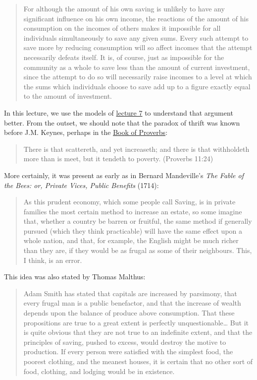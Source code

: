 \documentclass[]{book}
\theoremstyle{definition}
\theoremstyle{definition}
\theoremstyle{definition}
\theoremstyle{remark}
\begin{document}
\begin{quote}
For although the amount of his own saving is unlikely to have any
significant influence on his own income, the reactions of the amount of
his consumption on the incomes of others makes it impossible for all
individuals simultaneously to save any given sums. Every such attempt to
save more by reducing consumption will so affect incomes that the
attempt necessarily defeats itself. It is, of course, just as impossible
for the community as a whole to save less than the amount of current
investment, since the attempt to do so will necessarily raise incomes to
a level at which the sums which individuals choose to save add up to a
figure exactly equal to the amount of investment.
\end{quote}

In this lecture, we use the models of
\protect\hyperlink{cons-function}{lecture 7} to understand that argument
better. From the outset, we should note that the paradox of thrift was
known before J.M. Keynes, perhaps in the
\href{https://en.wikipedia.org/wiki/Book_of_Proverbs}{Book of Proverbs}:

\begin{quote}
There is that scattereth, and yet increaseth; and there is that
withholdeth more than is meet, but it tendeth to poverty. (Proverbs
11:24)
\end{quote}

More certainly, it was present as early as in Bernard Mandeville's
\emph{The Fable of the Bees: or, Private Vices, Public Benefits} (1714):

\begin{quote}
As this prudent economy, which some people call Saving, is in private
families the most certain method to increase an estate, so some imagine
that, whether a country be barren or fruitful, the same method if
generally pursued (which they think practicable) will have the same
effect upon a whole nation, and that, for example, the English might be
much richer than they are, if they would be as frugal as some of their
neighbours. This, I think, is an error.
\end{quote}

This idea was also stated by Thomas Malthus:

\begin{quote}
Adam Smith has stated that capitals are increased by parsimony, that
every frugal man is a public benefactor, and that the increase of wealth
depends upon the balance of produce above consumption. That these
propositions are true to a great extent is perfectly
unquestionable\ldots{} But it is quite obvious that they are not true to
an indefinite extent, and that the principles of saving, pushed to
excess, would destroy the motive to production. If every person were
satisfied with the simplest food, the poorest clothing, and the meanest
houses, it is certain that no other sort of food, clothing, and lodging
would be in existence.
\end{quote}
\end{document}
